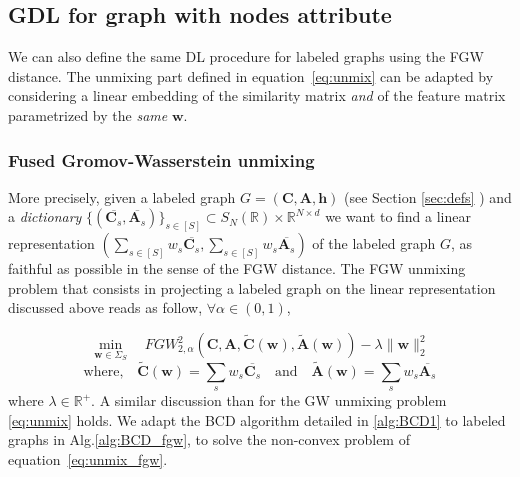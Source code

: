 \documentclass{article}
\def\eqref#1{equation~\ref{#1}}
\def\vh{{\bm{h}}}
\def\vw{{\bm{w}}}
\def\mA{{\bm{A}}}
\def\mC{{\bm{C}}}
\newcommand{\R}{\mathbb{R}}
\def\R{{\mathbb{R}}}
\begin{document}
	\subsection{GDL for graph with nodes attribute}
	We can also define the same DL procedure for labeled graphs using the FGW distance. The unmixing part defined in \eqref{eq:unmix} can be adapted by considering a linear embedding of the similarity matrix \emph{and} of the feature matrix parametrized by the \emph{same} $\vw$. 
	\subsubsection{Fused Gromov-Wasserstein unmixing}
	More precisely, given a labeled graph $G=(\mC,\mA,\vh)$ (see Section \ref{sec:defs} ) and a \emph{dictionary}
	$\{(\overline{\mC_s},\overline{\mA_s})\}_{s \in [S]} \subset S_N(\R) \times \R^{N \times d}$  we want to find a linear representation $(\sum_{s
		\in [S]} w_{s} \overline{\mC_s},\sum_{s
		\in [S]} w_{s} \overline{\mA_s})$ of the labeled graph $G$, as faithful as
	possible in the sense of the FGW distance. The FGW unmixing problem that consists in projecting a labeled graph on the linear representation discussed above reads as follow, $\forall \alpha \in (0,1)$, 
	
	\begin{equation}   
	\min_{\vw \in \Sigma_S}\quad FGW^2_{2,\alpha}\left(\mC,\mA, \widetilde{\mC}(\vw),\widetilde{\mA}(\vw)\right) - \lambda \|\vw\|^2_2 \label{eq:unmix_fgw}
	\end{equation}
	\begin{equation}
	\text{where,} \quad\widetilde{\mC}(\vw) = \sum_s w_s \overline{\mC_s} \quad \text{and} \quad \widetilde{\mA}(\vw) = \sum_s w_s \overline{\mA_s}
	\end{equation}
	where $\lambda \in \mathbb{R}^{+}$. A similar discussion than for the GW unmixing problem \ref{eq:unmix} holds. We adapt the BCD algorithm detailed in \ref{alg:BCD1} to labeled graphs in Alg.\ref{alg:BCD_fgw}, to solve the non-convex problem of \eqref{eq:unmix_fgw}.
	
\end{document}
